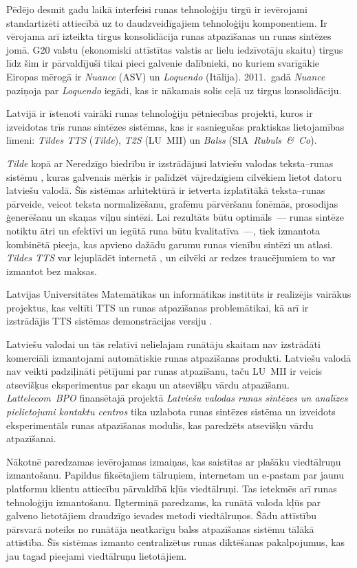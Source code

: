 \begin{multicols}{2}
Pēdējo desmit gadu laikā interfeisi runas tehnoloģiju tirgū ir ievērojami standartizēti attiecībā uz to daudzveidīgajiem tehnoloģiju komponentiem.
Ir vērojama arī izteikta tirgus konsolidācija runas atpazīšanas un runas sintēzes jomā.
G20 valstu (ekonomiski attīstītas valstis ar lielu iedzīvotāju skaitu) tirgus līdz šim ir pārvaldījuši tikai pieci galvenie dalībnieki, no kuriem svarīgākie Eiropas mērogā ir \textit{Nuance} (ASV) un \textit{Loquendo} (Itālija).
2011.~gadā \textit{Nuance} paziņoja par \textit{Loquendo} iegādi, kas ir nākamais solis ceļā uz tirgus konsolidāciju.

Latvijā ir īstenoti vairāki runas tehnoloģiju pētniecības projekti, kuros ir izveidotas trīs runas sintēzes sistēmas, kas ir sasniegušas praktiskas lietojamības līmeni: \textit{Tildes TTS} (\textit{Tilde}), \textit{T2S} (LU~MII) un \textit{Balss} (SIA\textit{~Rubuls~\&~Co}). 

\textit{Tilde} kopā ar Neredzīgo biedrību ir izstrādājusi latviešu valodas teksta--runas sistēmu \cite{Meta19}, kuras galvenais mērķis ir palīdzēt vājredzīgiem cilvēkiem lietot datoru latviešu valodā.
Šīs sistēmas arhitektūrā ir ietverta izplatītākā teksta--runas pārveide, veicot teksta normalizēšanu, grafēmu pārvēršanu fonēmās, prosodijas ģenerēšanu un skaņas viļņu sintēzi.
Lai rezultāts būtu optimāls~--- runas sintēze notiktu ātri un efektīvi un iegūtā runa būtu kvalitatīva~---, tiek izmantota kombinētā pieeja, kas apvieno dažādu garumu runas vienību sintēzi un atlasi. 
\textit{Tildes TTS} var lejuplādēt internetā \cite{Meta58}, un cilvēki ar redzes traucējumiem to var izmantot bez maksas.

Latvijas Universitātes Matemātikas un informātikas institūts ir realizējis vairākus projektus, kas veltīti TTS \cite{Meta20, Meta21} un runas atpazīšanas problemātikai, kā arī ir izstrādājis TTS sistēmas demonstrācijas versiju \cite{Meta22}.

Latviešu valodai un tās relatīvi nelielajam runātāju skaitam nav izstrādāti komerciāli izmantojami automātiskie runas atpazīšanas produkti.
Latviešu valodā nav veikti padziļināti pētījumi par runas atpazīšanu, taču LU~MII ir veicis atsevišķus eksperimentus par skaņu un atsevišķu vārdu atpazīšanu.
\textit{Lattelecom~BPO} finansētajā projektā \textit{Latviešu valodas runas sintēzes un analīzes pielietojumi kontaktu centros} tika uzlabota runas sintēzes sistēma un izveidots eksperimentāls runas atpazīšanas modulis, kas paredzēts atsevišķu vārdu atpazīšanai.

Nākotnē paredzamas ievērojamas izmaiņas, kas saistītas ar plašāku viedtālruņu izmantošanu.
Papildus fiksētajiem tālruņiem, internetam un e-pastam par jaunu platformu klientu attiecību pārvaldībā kļūs viedtālruņi. 
Tas ietekmēs arī runas tehnoloģiju izmantošanu.
Ilgtermiņā paredzams, ka runātā valoda kļūs par galveno lietotājiem draudzīgo ievades metodi viedtālruņos. 
Šādu attīstību pārsvarā noteiks no runātāja neatkarīgu balss atpazīšanas sistēmu tālākā attīstība.
Šīs sistēmas izmanto centralizētus runas diktēšanas pakalpojumus, kas jau tagad pieejami viedtālruņu lietotājiem. 


\end{multicols}
